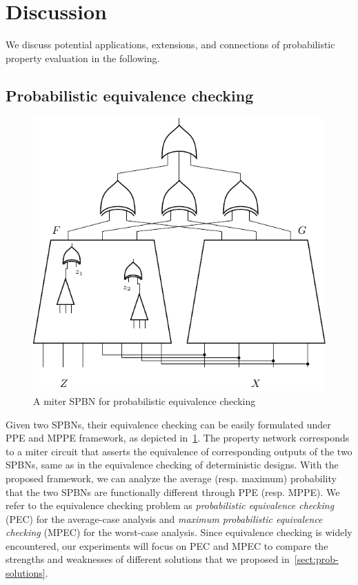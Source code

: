 \section{Discussion}
\label{sect:prob-discussion}

We discuss potential applications, extensions, and connections of probabilistic property evaluation in the following.

\subsection{Probabilistic equivalence checking}
\begin{figure}[t]
    \centering
    \includegraphics{fig/build/pec-miter.pdf}
    \caption{A miter SPBN for probabilistic equivalence checking}
    \label{fig:prob-PEC}
\end{figure}
Given two SPBNs, their equivalence checking can be easily formulated under PPE and MPPE framework,
as depicted in~\cref{fig:prob-PEC}.
The property network corresponds to a miter circuit
that asserts the equivalence of corresponding outputs of the two SPBNs,
same as in the equivalence checking of deterministic designs.
With the proposed framework,
we can analyze the average (resp. maximum) probability
that the two SPBNs are functionally different through PPE (resp. MPPE).
We refer to the equivalence checking problem as
\textit{probabilistic equivalence checking} (PEC) for the average-case analysis and
\textit{maximum probabilistic equivalence checking} (MPEC) for the worst-case analysis.
Since equivalence checking is widely encountered,
our experiments will focus on PEC and MPEC to compare the strengths and weaknesses of different solutions
that we proposed in~\cref{sect:prob-solutions}.

